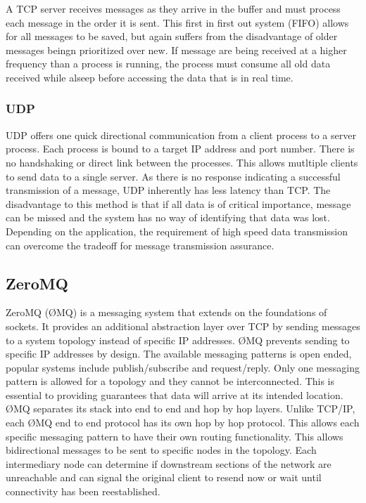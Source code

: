 A TCP server receives messages as they arrive in the buffer and must process each message in the order it is sent. This first in first out system (FIFO) allows for all messages to be saved, but again suffers from the disadvantage of older messages beingn prioritized over new. If message are being received at a higher frequency than a process is running, the process must consume all old data received while alseep before accessing the data that is in real time.

\subsubsection{UDP}

UDP offers one quick directional communication from a client process to a server process. Each process is bound to a target IP address and port number. There is no handshaking or direct link between the processes. This allows mutltiple clients to send data to a single server. As there is no response indicating a successful transmission of a message, UDP inherently has less latency than TCP. The disadvantage to this method is that if all data is of critical importance, message can be missed and the system has no way of identifying that data was lost. Depending on the application, the requirement of high speed data transmission can overcome the tradeoff for message transmission assurance.

\subsection{ZeroMQ}

ZeroMQ (ØMQ) is a messaging system that extends on the foundations of sockets. It provides an additional abstraction layer over TCP by sending messages to a system topology instead of specific IP addresses. ØMQ prevents sending to specific IP addresses by design. The available messaging patterns is open ended, popular systems include publish/subscribe and request/reply. Only one messaging pattern is allowed for a topology and they cannot be interconnected. This is essential to providing guarantees that data will arrive at its intended location. ØMQ separates its stack into end to end and hop by hop layers. Unlike TCP/IP, each ØMQ end to end protocol has its own hop by hop protocol\cite{ZMQTHEORY}. This allows each specific messaging pattern to have their own routing functionality. This allows bidirectional messages to be sent to specific nodes in the topology. Each intermediary node can determine if downstream sections of the network are unreachable and can signal the original client to resend now or wait until connectivity has been reestablished. 

